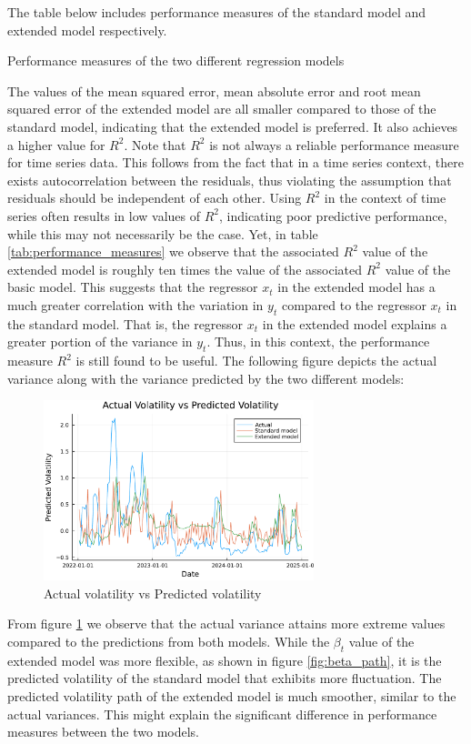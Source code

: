 The table below includes performance measures of the standard model and extended model respectively.
\begin{table}[H]
    \centering

\caption{Performance measures of the two different regression models} 
\label{tab:performance_measures}
\end{table}
The values of the mean squared error, mean absolute error and root mean squared error of the extended model are all smaller compared to those of the standard model, indicating that the extended model is preferred. It also achieves a higher value for \(R^2\). Note that \(R^2\) is not always a reliable performance measure for time series data. This follows from the fact that in a time series context, there exists autocorrelation between the residuals, thus violating the assumption that residuals should be independent of each other. Using \(R^2\) in the context of time series often results in low values of \(R^2\), indicating poor predictive performance, while this may not necessarily be the case. Yet, in table \ref{tab:performance_measures} we observe that the associated \(R^2\) value of the extended model is roughly ten times the value of the associated \(R^2\) value of the basic model. This suggests that the regressor \(x_t\) in the extended model has a much greater correlation with the variation in \(y_t\) compared to the regressor \(x_t\) in the standard model. That is, the regressor \(x_t\) in the extended model explains a greater portion of the variance in \(y_t\). Thus, in this context, the performance measure \(R^2\) is still found to be useful.
The following figure depicts the actual variance along with the variance predicted by the two different models:

\begin{figure}[H]
    \centering
    \includegraphics[width=0.7\textwidth]{figures/predicting_volatility.pdf}
    \caption{Actual volatility vs Predicted volatility}
    \label{fig:predicting_volatility}
\end{figure}
From figure \ref{fig:predicting_volatility} we observe that the actual variance attains more extreme values compared to the predictions from both models. While the \(\beta_t\) value of the extended model was more flexible, as shown in figure \ref{fig:beta_path}, it is the predicted volatility of the standard model that exhibits more fluctuation. The predicted volatility path of the extended model is much smoother, similar to the actual variances. This might explain the significant difference in performance measures between the two models. 

